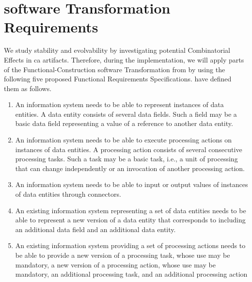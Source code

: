 \section{software Transformation Requirements} \label{sec_requirements_transformation}

We study stability and evolvability by investigating potential Combinatorial Effects in
\gls{ca} artifacts. Therefore, during the implementation, we will apply parts of the
Functional-Construction software Transformation from
\textcite[251]{mannaert_normalized_2016} by using the following five proposed Functional
Requirements Specifications. \textcite[254-261]{mannaert_normalized_2016} have defined
them as follows.

\begin{enumerate}[leftmargin=*]
    \item An information system needs to be able to represent instances of
    data entities. A data entity consists of several data fields. Such a field may be a basic
    data field representing a value of a reference to another data entity.
    
    \item An information system needs to be able to execute processing actions on
    instances of data entities. A processing action consists of several consecutive processing
    tasks. Such a task may be a basic task, i.e., a unit of processing that can change
    independently or an invocation of another processing action.
    
    \item An information system needs to be able to input or output values
    of instances of data entities through connectors.
    
    \item An existing information system representing a set of data entities needs to be
    able to represent a new version of a data entity that corresponds to including an
    additional data field and an additional data entity.
    
    \item An existing information system providing a set of processing actions needs to
    be able to provide a new version of a processing task, whose use may be mandatory, a
    new version of a processing action, whose use may be mandatory, an additional
    processing task, and an additional processing action
    
\end{enumerate}